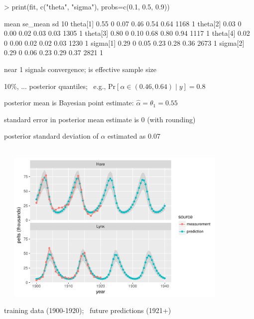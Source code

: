 \documentclass[10pt]{report}
\begin{document}
%
\vspace*{-12pt}
%
{\small
\begin{stancode}
> print(fit, c("theta", "sigma"), probs=c(0.1, 0.5, 0.9))
\end{stancode}
\vspace*{-2pt}
\begin{stancode}
         mean se_mean    sd   10%
theta[1] 0.55       0  0.07  0.46  0.54  0.64   1168    1
theta[2] 0.03       0  0.00  0.02  0.03  0.03   1305    1
theta[3] 0.80       0  0.10  0.68  0.80  0.94   1117    1
theta[4] 0.02       0  0.00  0.02  0.02  0.03   1230    1
sigma[1] 0.29       0  0.05  0.23  0.28  0.36   2673    1
sigma[2] 0.29       0  0.06  0.23  0.29  0.37   2821    1
\end{stancode}
}
\vspace*{4pt}
\begin{subitemize}
\item {} near 1 signals convergence;
  is effective sample size
\vspace*{-3pt}
\item 10\%, ... posterior quantiles; \ e.g., $\mbox{Pr}[\alpha \in
  (0.46, 0.64) \mid y] = 0.8$
\vspace*{-3pt}
\item posterior mean is Bayesian point estimate: $\hat{\alpha} =
  \theta_1 = 0.55$
\vspace*{-3pt}
\item standard error in posterior mean estimate is 0 (with rounding)
\vspace*{-3pt}
\item posterior standard deviation of $\alpha$ estimated as 0.07
\end{subitemize}

%
\\[4pt]
\spc \ \ \ \includegraphics[width=0.8\textwidth]{img/lotka-volterra-predict.pdf}
\vspace*{-4pt}
\begin{subsubitemize}
\item training data (1900-1920); \ future predictions (1921+)
\end{subsubitemize}
\end{document}
